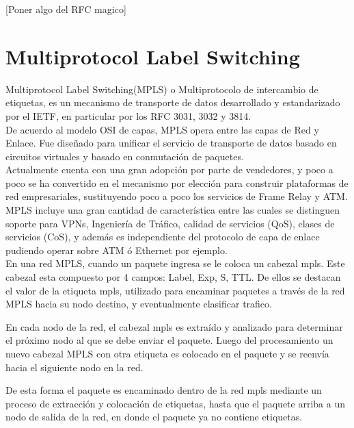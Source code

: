 [Poner algo del RFC magico]

\section{Multiprotocol Label Switching}


Multiprotocol Label Switching(MPLS) o Multiprotocolo de intercambio de etiquetas, es un mecanismo de transporte de datos desarrollado y estandarizado por el IETF, en particular por los RFC 3031\cite{rosen2001multiprotocol}, 3032\citep{rosen2001mpls} y 3814\citep{nadeau2004multiprotocol}.\\

De acuerdo al modelo OSI de capas, MPLS opera entre las capas de Red y Enlace. Fue diseñado para unificar el servicio de transporte de datos basado en circuitos virtuales y basado en conmutación de paquetes.\\

Actualmente cuenta con una gran adopción por parte de vendedores, y poco a poco se ha convertido en el mecanismo por elección para construir plataformas de red empresariales, sustituyendo poco a poco los servicios de Frame Relay y ATM.\\
 
MPLS incluye una gran cantidad de característica entre las cuales se distinguen soporte para VPNs, Ingeniería de Tráfico, calidad de servicios (QoS), clases de servicios (CoS), y además es independiente del protocolo de capa de enlace pudiendo operar sobre ATM ó Ethernet por ejemplo.\\

En una red MPLS, cuando un paquete ingresa se le coloca un cabezal mpls. Este cabezal esta compuesto por 4 campos: Label, Exp, S, TTL. De ellos se destacan el valor de la etiqueta mpls, utilizado para encaminar paquetes a través de la red MPLS hacia su nodo destino, y eventualmente clasificar trafico.

En cada nodo de la red, el cabezal mpls es extraído y analizado para determinar el próximo nodo al que se debe enviar el paquete. Luego del procesamiento un nuevo cabezal MPLS con otra etiqueta es colocado en el paquete y se reenvía hacia el siguiente nodo en la red.

De esta forma el paquete es encaminado dentro de la red mpls mediante un proceso de extracción y colocación de etiquetas, hasta que el paquete arriba a un nodo de salida de la red, en donde el paquete ya no contiene etiquetas.\\

